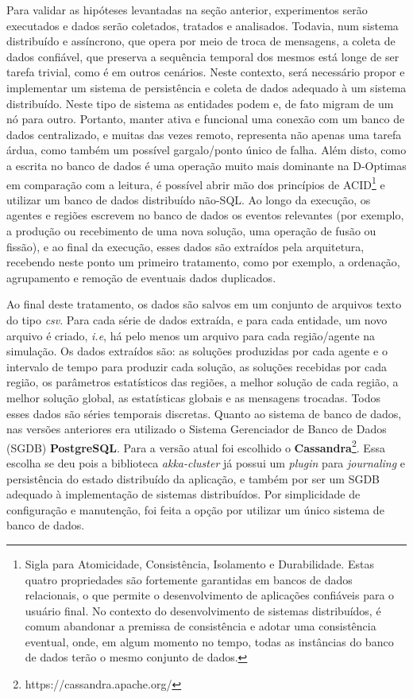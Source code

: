 Para validar as hipóteses levantadas na seção anterior, experimentos serão executados e dados serão coletados, tratados e analisados. Todavia, num sistema distribuído e assíncrono, que opera por meio de troca de mensagens, a coleta de dados confiável, que preserva a sequência temporal dos mesmos está longe de ser tarefa trivial, como é em outros cenários. Neste contexto, será necessário propor e implementar um sistema de persistência e coleta de dados adequado à um sistema distribuído. Neste tipo de sistema as entidades podem e, de fato migram de um nó para outro. Portanto, manter ativa e funcional uma conexão com um banco de dados centralizado, e muitas das vezes remoto, representa não apenas uma tarefa árdua, como também um possível gargalo/ponto único de falha. Além disto, como a escrita no banco de dados é uma operação muito mais dominante na D-Optimas em comparação com a leitura, é possível abrir mão dos princípios de ACID\footnote{Sigla  para Atomicidade, Consistência, Isolamento e Durabilidade. Estas quatro propriedades são fortemente garantidas em bancos de dados relacionais, o que permite o desenvolvimento de aplicações confiáveis para o usuário final. No contexto do desenvolvimento de sistemas distribuídos, é comum abandonar a premissa de consistência e adotar uma consistência eventual, onde, em algum momento no tempo, todas as instâncias do banco de dados terão o mesmo conjunto de dados.} e utilizar um banco de dados distribuído não-SQL. Ao longo da execução, os agentes e regiões escrevem no banco de dados os eventos relevantes (por exemplo, a produção ou recebimento de uma nova solução, uma operação de fusão ou fissão), e ao final da execução, esses dados são extraídos pela arquitetura, recebendo neste ponto um primeiro tratamento, como por exemplo, a ordenação, agrupamento e remoção de eventuais dados duplicados. 

Ao final deste tratamento, os dados são salvos em um conjunto de arquivos texto do tipo \textit{csv}. Para cada série de dados extraída, e para cada entidade, um novo arquivo é criado, \textit{i.e}, há pelo menos um arquivo para cada região/agente na simulação. Os dados extraídos são: as soluções produzidas por cada agente e o intervalo de tempo para produzir cada solução, as soluções recebidas por cada região, os parâmetros estatísticos das regiões, a melhor solução de cada região, a melhor solução global, as estatísticas globais e as mensagens trocadas. Todos esses dados são séries temporais discretas. Quanto ao sistema de banco de dados, nas versões anteriores era utilizado o Sistema Gerenciador de Banco de Dados (SGDB) \textbf{PostgreSQL}. Para a versão atual foi escolhido o \textbf{Cassandra}\footnote{https://cassandra.apache.org/}. Essa escolha se deu pois a biblioteca \textit{akka-cluster} já possui um \textit{plugin} para \textit{journaling} e persistência do estado distribuído da aplicação, e também por ser um SGDB adequado à implementação de sistemas distribuídos. Por simplicidade de configuração e manutenção, foi feita a opção por utilizar um único sistema de banco de dados.

